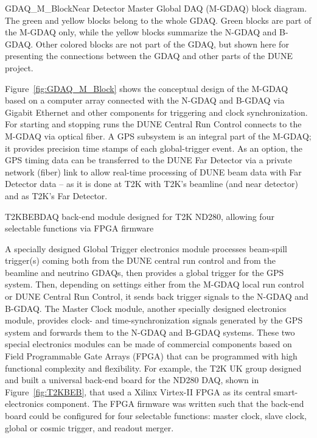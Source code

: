 \begin{cdrfigure}{GDAQ_M_Block}{Near 
Detector Master Global DAQ (M-GDAQ) block diagram. 
The green and yellow blocks belong to the whole GDAQ.  Green blocks are
part of the M-GDAQ only, while the yellow blocks summarize the N-GDAQ and B-GDAQ.  Other colored blocks are not
part of the GDAQ, but shown here for presenting the connections between
the GDAQ and other parts of the DUNE project.}
\end{cdrfigure}

Figure~\ref{fig:GDAQ_M_Block} shows the conceptual design of the M-GDAQ 
based on a computer array connected with the N-GDAQ and B-GDAQ via 
Gigabit Ethernet and other components for triggering and clock 
synchronization. For starting and stopping runs the DUNE Central Run Control 
connects to the M-GDAQ via optical fiber. A GPS subsystem is an 
integral part of the M-GDAQ; it provides precision time stamps of each 
global-trigger event.  As an option, the GPS timing data can be 
transferred to the DUNE Far Detector via a private network (fiber) link 
to allow real-time processing of DUNE beam data with Far Detector data -- 
as it is done at T2K with T2K's beamline (and near detector) and \superk
as T2K's Far Detector. 

\begin{cdrfigure}{T2KBEB}{DAQ back-end module designed for T2K ND280, allowing four selectable functions via FPGA firmware}
\end{cdrfigure}

A specially designed Global Trigger electronics module processes 
beam-spill trigger(s) coming 
both from the DUNE central run control and from the beamline and neutrino GDAQs,
then provides a global trigger for 
the GPS system. 
Then, 
depending on settings either from the M-GDAQ local run control or DUNE 
Central Run Control, it sends back trigger signals to the N-GDAQ and B-GDAQ.  
The Master Clock module, another specially 
designed electronics module, provides clock- and time-synchronization 
signals generated by the GPS system and forwards them to the N-GDAQ and 
B-GDAQ systems.  These two special electronics modules can be made of 
commercial components based on Field Programmable Gate Arrays (FPGA) 
that can be programmed with high functional complexity and flexibility. 
For example, the T2K UK group designed and built a universal back-end board for 
the ND280 DAQ, shown in Figure~\ref{fig:T2KBEB}, that used a Xilinx Virtex-II 
FPGA as its central smart-electronics component. The FPGA firmware was 
written such that the back-end board could be configured for four 
selectable functions: master clock, slave clock, global or cosmic 
trigger, and readout merger.

